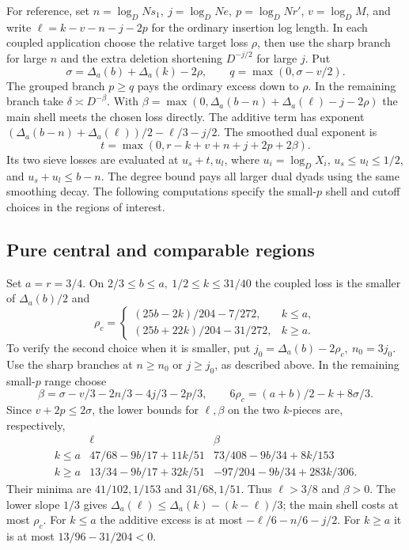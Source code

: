 For reference, set \(n=\log_D Ns_1,\ j=\log_D Ne,\ p=\log_D Nr'\),
\(v=\log_D M\), and write \(\ell=k-v-n-j-2p\) for the ordinary
insertion log length. In each coupled application choose the
relative target loss \(\rho\), then use the sharp branch for
large \(n\) and the extra deletion shortening \(D^{-j/2}\) for
large \(j\). Put
\[
 \sigma=\Delta_a(b)+\Delta_a(k)-2\rho,\qquad
 q=\max(0,\sigma-v/2).
\]
The grouped branch \(p\ge q\) pays the ordinary excess down to
\(\rho\). In the remaining branch take \(\delta\asymp D^{-\beta}\).
With
\(\beta=\max(0,\Delta_a(b-n)+\Delta_a(\ell)-j-2\rho)\)
the main shell meets the chosen loss directly.
The additive term has exponent
\((\Delta_a(b-n)+\Delta_a(\ell))/2-\ell/3-j/2\).
The smoothed dual exponent is
\[
 t=\max(0,r-k+v+n+j+2p+2\beta).
\]
Its two sieve losses are evaluated at \(u_s+t,u_l\), where
\(u_i=\log_D X_i\), \(u_s\le u_l\le1/2\), and \(u_s+u_l\le b-n\).
The degree bound pays all larger dual dyads using the same
smoothing decay. The following computations specify the
small-\(p\) shell and cutoff choices in the regions of interest.

\subsection{Pure central and comparable regions}
\label{pca:detail-central}

Set \(a=r=3/4\). On \(2/3\le b\le a,\ 1/2\le k\le31/40\)
the coupled loss is the smaller of \(\Delta_a(b)/2\) and
\[
 \rho_c=
 \begin{cases}
 (25b-2k)/204-7/272,& k\le a,\\
 (25b+22k)/204-31/272,& k\ge a .
 \end{cases}
\]
To verify the second choice when it is smaller, put
\(j_0=\Delta_a(b)-2\rho_c,\ n_0=3j_0\). Use the sharp branches
at \(n\ge n_0\) or \(j\ge j_0\), as described above. In the
remaining small-\(p\) range choose
\[
 \beta=\sigma-v/3-2n/3-4j/3-2p/3,\qquad
 6\rho_c=(a+b)/2-k+8\sigma/3 .
\]
Since \(v+2p\le2\sigma\), the lower bounds for \(\ell,\beta\)
on the two \(k\)-pieces are, respectively,
\[
 \begin{array}{c|cc}
 &\ell&\beta\\ \hline
 k\le a&47/68-9b/17+11k/51&73/408-9b/34+8k/153\\
 k\ge a&13/34-9b/17+32k/51&-97/204-9b/34+283k/306 .
 \end{array}
\]
Their minima are \(41/102,1/153\) and \(31/68,1/51\).
Thus \(\ell>3/8\) and \(\beta>0\).
The lower slope \(1/3\) gives
\(\Delta_a(\ell)\le\Delta_a(k)-(k-\ell)/3\);
the main shell costs at most \(\rho_c\).
For \(k\le a\) the additive excess is at most
\(-\ell/6-n/6-j/2\).
For \(k\ge a\) it is at most \(13/96-31/204<0\).

